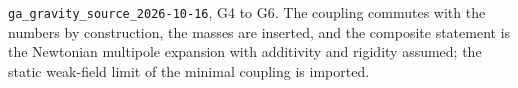 \texttt{ga\_gravity\_source\_2026-10-16}, G4 to G6. The coupling commutes with the numbers by construction, the masses are inserted, and the composite statement is the Newtonian multipole expansion with additivity and rigidity assumed; the static weak-field limit of the minimal coupling is imported.
